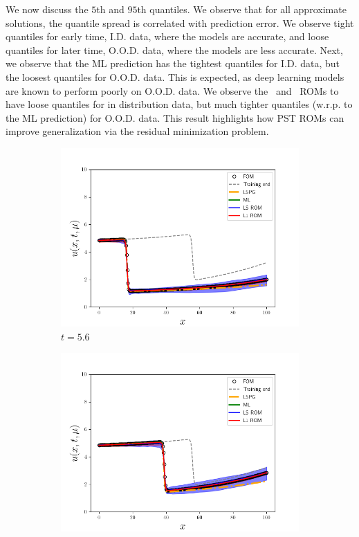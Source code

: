 \documentclass[3p,computermodern,10pt]{elsarticle}
\begin{document}
We now discuss the $5$th and $95$th quantiles. We observe that for all approximate solutions, the quantile spread is correlated with prediction error. We observe tight quantiles for early time, I.D. data, where the models are accurate, and loose quantiles for later time, O.O.D. data, where the models are less accurate. Next, we observe that the ML prediction has the tightest quantiles for I.D. data, but the loosest quantiles for O.O.D. data. This is expected, as deep learning models are known to perform poorly on O.O.D. data. We observe the \PSTLSROM\ and \PSTLONEROM\ ROMs to have loose quantiles for in distribution data, but much tighter quantiles (w.r.p. to the ML prediction) for O.O.D. data. This result highlights how PST ROMs can improve generalization via the residual minimization problem. 
\begin{figure}
\begin{center}
\begin{subfigure}[t]{0.24\textwidth}
\includegraphics[trim={0cm 0cm 0cm 0cm},clip,width=1.0\linewidth]{code/burgers/synapse_models/basis_study/results/figures/uquartiles_mu1_3_mu2_3_t_0080.png} 
\caption{$t=5.6$}
\end{subfigure}
\begin{subfigure}[t]{0.24\textwidth}
\includegraphics[trim={0cm 0cm 0cm 0cm},clip,width=1.0\linewidth]{code/burgers/synapse_models/basis_study/results/figures/uquartiles_mu1_3_mu2_3_t_0180.png} 

\end{subfigure}
\end{center}
\end{figure}
\end{document}
